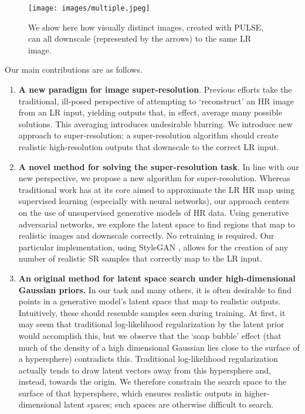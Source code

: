 \documentclass[10pt,twocolumn,letterpaper]{article}
\begin{document}
\begin{figure}[!t]
    \centering
    \texttt{[image: images/multiple.jpeg]}
    \caption{We show here how visually distinct images, created with PULSE, can all downscale (represented by the arrows) to the same LR image. }
    \label{fig:multipledownscale}
\end{figure}

Our main contributions are as follows.
\begin{enumerate}
    \item \textbf{A new paradigm for image super-resolution}. Previous efforts take the traditional, ill-posed perspective of attempting to `reconstruct' an HR image from an LR input, yielding outputs that, in effect, average many possible solutions. This averaging introduces undesirable blurring. We introduce new approach to super-resolution: a super-resolution algorithm should create realistic high-resolution outputs that downscale to the correct LR input.
    \item \textbf{A novel method for solving the super-resolution task}. In line with our new perspective, we propose a new algorithm for super-resolution. Whereas traditional work has at its core aimed to approximate the LR  HR map using supervised learning (especially with neural networks), our approach centers on the use of unsupervised generative models of HR data. Using generative adversarial networks, we explore the latent space to find regions that map to realistic images and downscale correctly. No retraining is required. Our particular implementation, using StyleGAN \cite{karras2019style}, allows for the creation of any number of realistic SR samples that correctly map to the LR input.
    \item \textbf{An original method for latent space search under high-dimensional Gaussian priors.} In our task and many others, it is often desirable to find points in a generative model's latent space that map to realistic outputs. Intuitively, these should resemble samples seen during training. At first, it may seem that traditional log-likelihood regularization by the latent prior would accomplish this, but we observe that the `soap bubble' effect (that much of the density of a high dimensional Gaussian lies close to the surface of a hypersphere) contradicts this. Traditional log-likelihood regularization actually tends to draw latent vectors away from this hypersphere and, instead, towards the origin. We therefore constrain the search space to the surface of that hypersphere, which ensures realistic outputs in higher-dimensional latent spaces; such spaces are otherwise difficult to search.
    
    
\end{enumerate}
\end{document}
